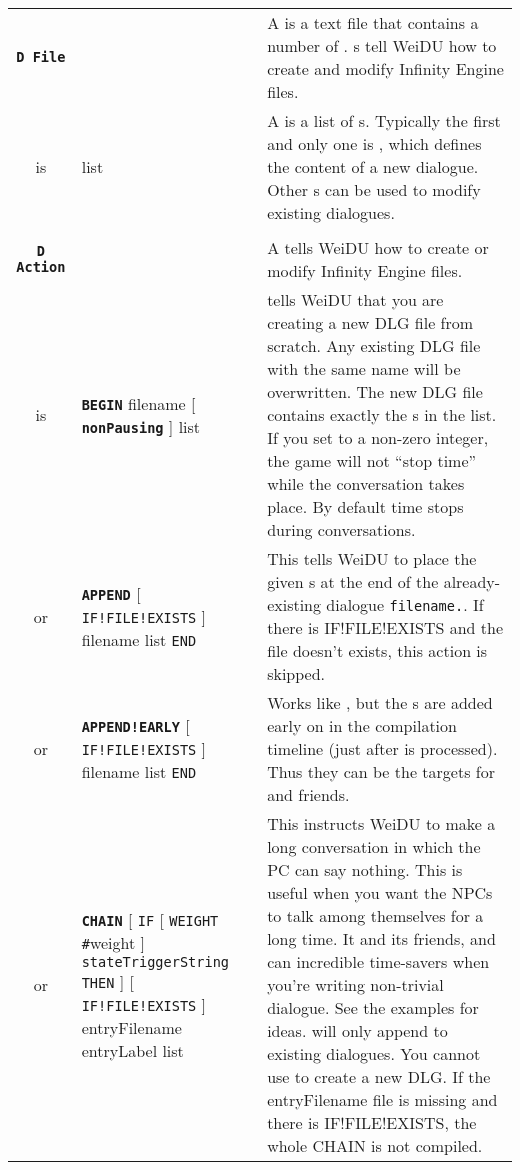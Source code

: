 \documentclass{article}
\def\ttref#1{\ahrefloc{#1}{\tt #1}}
\def\DEFINE#1{{\tt \bf #1}\label{#1}\index{#1}}
\def\t#1{{\tt #1}}
\def\Slist{{\color{red} list }}
\def\Ob{{\color{red} [ }}
\def\Oe{{\color{red} ] }}
\begin{document}
\begin{tabular}{cp{10in}|p{10in}}

\DEFINE{D File} & &
  A \ttref{D file} is a text file that contains a number of \ttref{D
  Actions}. \ttref{D File}s tell WeiDU how to create and modify Infinity
  Engine \ttref{DLG} files.  \\

  is & \ttref{D Action} \Slist &
  A \ttref{D File} is a list of \ttref{D Action}s. Typically the first and
  only one is \ttref{BEGIN}, which defines the content of a new dialogue.
  Other \ttref{D Action}s can be used to modify existing dialogues. \\

\\

\DEFINE{D Action} & &
  A \ttref{D Action} tells WeiDU how to create or modify Infinity Engine
  \ttref{DLG} files. \\

  is & \DEFINE{BEGIN} filename \Ob \DEFINE{nonPausing} \Oe \ttref{state} \Slist &
    \ttref{BEGIN} tells WeiDU that you are creating a new DLG file from
    scratch. Any existing DLG file with the same name will be overwritten.
    The new DLG file contains exactly the \ttref{state}s in the list.
    If you set \ttref{nonPausing} to a non-zero integer, the game will not
    ``stop time'' while the conversation takes place. By default time stops
    during conversations.  \\

  or   & \DEFINE{APPEND} \Ob \t{IF!FILE!EXISTS} \Oe filename \ttref{state} \Slist {\tt END} &
    This tells WeiDU to place the given \ttref{state}s at the end of the
    already-existing dialogue \t{filename.}\ttref{DLG}. If there is IF!FILE!EXISTS
    and the file doesn't exists, this action is skipped. \\

  or   & \DEFINE{APPEND!EARLY} \Ob \t{IF!FILE!EXISTS} \Oe filename \ttref{state} \Slist {\tt END} &
    Works like \ttref{APPEND}, but the \ttref{state}s are added early on in
    the compilation timeline (just after \ttref{BEGIN} is processed). Thus
    they can be the targets for \ttref{INTERJECT!COPY!TRANS} and friends.
    \\

  or & \DEFINE{CHAIN}
    \Ob {\tt IF} \Ob {\tt WEIGHT} {\tt \#}weight \Oe {\tt
    stateTriggerString}  {\tt THEN} \Oe \Ob \t{IF!FILE!EXISTS} \Oe
    entryFilename entryLabel \ttref{chainText} \Slist
    \ttref{chainEpilogue} &
  This instructs WeiDU to make a long conversation in which the PC can say
  nothing. This is useful when you want the NPCs to talk among themselves
  for a long time. It and its friends, \ttref{INTERJECT} and
  \ttref{INTERJECT!COPY!TRANS} can incredible time-savers when you're
  writing non-trivial dialogue. See the examples for ideas. \ttref{CHAIN}
  will only append to existing dialogues. You cannot use \ttref{CHAIN} to
  create a new DLG. If the entryFilename file is missing and there is IF!FILE!EXISTS,
  the whole CHAIN is not compiled.
  \\


\end{tabular}
\end{document}

